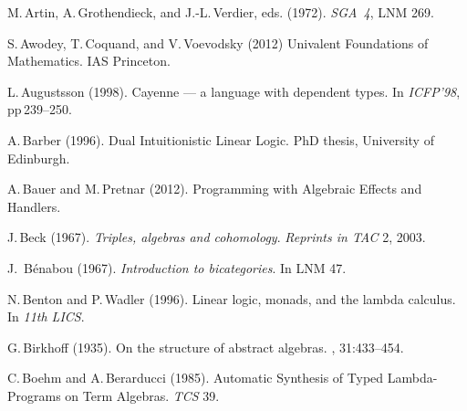 \documentclass[11pt,twocolumn]{article}
\newcommand{\hide}[1]{}
\begin{document}
{\begin{thebibliography}{000}
M.\,Artin, A.\,Grothendieck, and J.-L.\,Verdier, eds. (1972).
\newblock \emph{SGA~4}, LNM 269. 

S.\,Awodey, T.\,Coquand, and V.\,Voevodsky (2012)
\newblock Univalent Foundations of Mathematics.
\newblock IAS Princeton.


L.\,Augustsson (1998).
\newblock Cayenne --- a language with dependent types.
\newblock In \emph{ICFP'98}, pp\,239--250.

A.\,Barber (1996).
\newblock Dual Intuitionistic Linear Logic. 
\newblock PhD thesis, University of Edinburgh. 

A.\,Bauer and M.\,Pretnar (2012).
\newblock Programming with Algebraic Effects and Handlers.

J.\,Beck (1967).
\newblock \emph{Triples, algebras and cohomology}.
\newblock \emph{Reprints in TAC} 2, 2003. 


\hide{
\bibitem{BeesonBook}
M.\,Beeson (1984).
\newblock Foundations of constructive mathematics.
}


J.~B{\'e}nabou (1967). 
\newblock \emph{Introduction to bicategories}. 
\newblock In LNM 47.

N.\,Benton and P.\,Wadler (1996). 
\newblock Linear logic, monads, and the lambda calculus.
\newblock In \emph{11th LICS}.

G.\,Birkhoff (1935).
\newblock On the structure of abstract algebras.
, 31:433--454. 
  
C.\,Boehm and A.\,Berarducci (1985). 
\newblock Automatic Synthesis of Typed Lambda-Programs on Term Algebras.
\newblock \emph{TCS} 39.


\end{thebibliography}}
\end{document}
